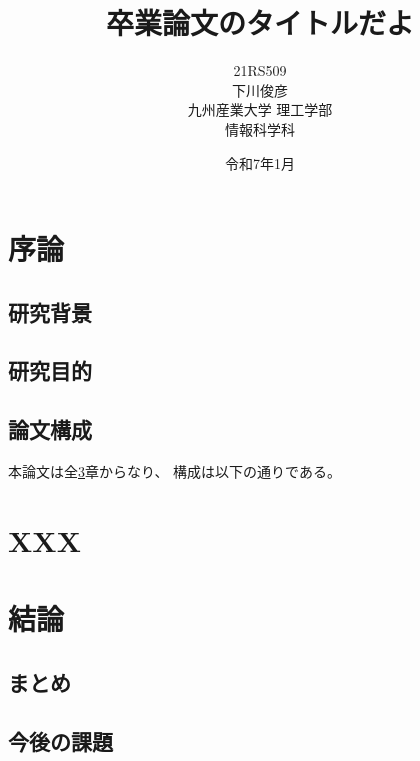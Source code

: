\documentclass[a4paper,12pt]{ujreport}
\title{
 \Huge{卒業論文のタイトルだよ}
 \vspace{3.5cm}\\
}
\author{
 \LARGE{21RS509}\vspace{0.5cm}\\
 \LARGE{下川俊彦}\vspace{2cm}\\
 \LARGE{九州産業大学 理工学部}\vspace{0.5cm}\\
 \LARGE{情報科学科}\vspace{1cm}\\
}
\date{\LARGE{令和7年1月}}
\begin{document}
\maketitle
\setcounter{page}{0}
\tableofcontents
\listoffigures
\listoftables
\clearpage
\setcounter{page}{0}


\chapter{序論}\label{chap:joron}

\section{研究背景}\label{sec:haikei}
    
\section{研究目的}\label{sec:mokuteki}

\section{論文構成}\label{sec:kousei}

本論文は全\ref{chap:keturon}章からなり、
構成は以下の通りである。


\chapter{XXX}\label{chap:xxx}


\chapter{結論}\label{chap:keturon}

\section{まとめ}\label{sec:matome}
 
\section{今後の課題}\label{sec:kadai}
\end{document}
